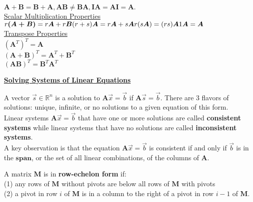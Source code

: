 \documentclass{article}
\begin{document}
    \begin{theorem}
    $\boldsymbol{\boldsymbol{A} + \boldsymbol{B} = \boldsymbol{B} + \boldsymbol{A}, \boldsymbol{AB} \neq \boldsymbol{BA}, \boldsymbol{IA = AI = A}.} $
    \\ \underline{Scalar Multiplication Properties} \\
    $r\boldsymbol{(A+B)} = r\boldsymbol{A} + r\boldsymbol{B} \\ (r+s)\boldsymbol{A} = r\boldsymbol{A} + s\boldsymbol{A} \\    r(s\boldsymbol{A}) = (rs)\boldsymbol{A}\\
    1\boldsymbol{A} = \boldsymbol{A}$ \\
    
    \underline{Transpose Properties} \\
    $(\boldsymbol{A}^T)^T = \boldsymbol{A}$ \\
    $(\boldsymbol{A} + \boldsymbol{B})^T = \boldsymbol{A}^T + \boldsymbol{B}^T$ \\
    $(\boldsymbol{AB})^T = \boldsymbol{B}^T\boldsymbol{A}^T$ \\
    \end{theorem} 
    
    \textbf{\underline{Solving Systems of Linear Equations}}
    
    \begin{definition}
    A vector $\vec{s} \in \mathbb{R}^n$ is a solution to $\boldsymbol{A}\vec{x} = \vec{b}$ if $\boldsymbol{A}\vec{s} = \vec{b}.$ There are 3 flavors of solutions: unique, infinite, or no solutions to a given equation of this form. \\
    
    Linear systems $\boldsymbol{A}\vec{x} = \vec{b}$ that have one or more solutions are called \textbf{consistent systems} while linear systems that have no solutions are called \textbf{inconsistent systems}. \\
    
    A key observation is that the equation $\boldsymbol{A}\vec{x} = \vec{b}$ is consistent if and only if $\vec{b}$ is in the $\textbf{span}$, or the set of all linear combinations, of the columns of $\boldsymbol{A}$.
    \end{definition}
    
    \begin{definition}
    A matrix $\boldsymbol{M}$ is in \textbf{row-echelon form} if: \\
    (1) any rows of $\boldsymbol{M}$ without pivots are below all rows of $\boldsymbol{M}$ with pivots\\ (2) a pivot in row $i$ of $\boldsymbol{M}$ is in a column to the right of a pivot in row $i-1$ of $\boldsymbol{M}$.
    \end{definition} 
    
\end{document}
